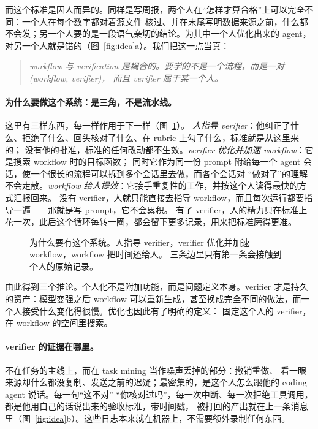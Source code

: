 \documentclass[10pt,UTF8,scheme=plain]{ctexart}
\begin{document}
而这个标准是因人而异的。同样是写周报，两个人在“怎样才算合格”上可以完全不同：一个人在每个数字都对着源文件
核过、并在末尾写明数据来源之前，什么都不会发；另一个人要的是一段语气亲切的结论。为其中一个人优化出来的 agent，
对另一个人就是错的（图~\ref{fig:idea}a）。我们把这一点当真：

\begin{quote}
\emph{workflow 与 verification 是耦合的。要学的不是一个流程，而是一对 (workflow, verifier)，
而且 verifier 属于某一个人。}
\end{quote}

\paragraph{为什么要做这个系统：是三角，不是流水线。} 这里有三样东西，每一样作用于下一样（图~\ref{fig:triangle}）。
\emph{人指导 verifier}：他纠正了什么、拒绝了什么、回头核对了什么、在 rubric 上勾了什么，标准就是从这里来的；
没有他的批准，标准的任何改动都不生效。\emph{verifier 优化并加速 workflow}：它是搜索 workflow 时的目标函数；
同时它作为同一份 prompt 附给每一个 agent 会话，使一个很长的流程可以拆到多个会话里去做，而各个会话对
“做对了”的理解不会走散。\emph{workflow 给人提效}：它接手重复性的工作，并按这个人读得最快的方式汇报回来。
没有 verifier，人就只能直接去指导 workflow，而且每次运行都要指导一遍——那就是写 prompt，它不会累积。
有了 verifier，人的精力只在标准上花一次，此后这个循环每转一圈，都会留下更多记录，用来把标准磨得更准。

\begin{figure}[t]
\centering

\caption{为什么要有这个系统。人指导 verifier，verifier 优化并加速 workflow，workflow 把时间还给人。
三条边里只有第一条会接触到个人的原始记录。}
\label{fig:triangle}
\end{figure}

由此得到三个推论。个人化不是附加功能，而是问题定义本身。verifier 才是持久的资产：模型变强之后 workflow
可以重新生成，甚至换成完全不同的做法，而一个人接受什么变化得很慢。优化也因此有了明确的定义：
固定这个人的 verifier，在 workflow 的空间里搜索。

\paragraph{verifier 的证据在哪里。} 不在任务的主线上，而在 task mining 当作噪声丢掉的部分：撤销重做、
看一眼来源却什么都没复制、发送之前的迟疑；最密集的，是这个人怎么跟他的 coding agent 说话。每一句“这不对”
“你核对过吗”，每一次中断、每一次拒绝工具调用，都是他用自己的话说出来的验收标准，带时间戳，
被打回的产出就在上一条消息里（图~\ref{fig:idea}b）。这些日志本来就在机器上，不需要额外录制任何东西。
\end{document}
